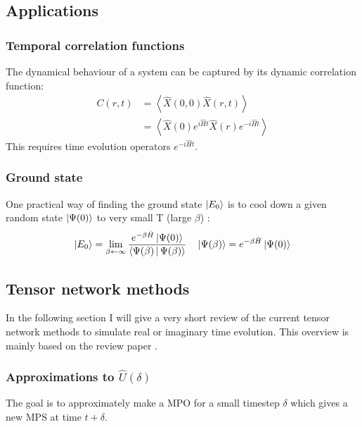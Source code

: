 \subsection{Applications}

\subsubsection{Temporal correlation functions}
The dynamical behaviour of a system can be captured by its dynamic correlation function:
\begin{equation}
    \begin{split}
        C(r,t) &= \left<  \hat{X}(0,0) \hat{X}(r,t)  \right >\\
        &=  \left<  \hat{X}(0)  e^{i \hat{H} t}  \hat{X}(r)  e^{-i \hat{H} t}   \right >
    \end{split}
\end{equation}
This requires time evolution operators $e^{-i \hat{H} t}$.

\subsubsection{Ground state}
One practical way of finding the ground state $ \ket{E_0}$ is to cool down a given random state $ \ket{\Psi(0)}$ to very small T (large $\beta$) \cite{Orus2014}:
\begin{equation}
    \ket{E_0} = \lim_{\beta \leftarrow \infty} \frac{e^{-\beta \hat{H} } \ket{\Psi(0)}  }{  \Braket{ \Psi(\beta) | \Psi(\beta) }  } \quad  \ket{\Psi(\beta)} =  e^{-\beta \hat{H} } \ket{\Psi(0)}
\end{equation}

\subsection{Tensor network methods}
In the following section I will give a very short review of the current tensor network methods to simulate real or imaginary time evolution. This overview is mainly based on the review paper \cite{Paeckel2019}.


\subsubsection{Approximations to  \texorpdfstring{$ \hat{U}(\delta)$}{U}   }
The goal is to approximately make a MPO for a small timestep $\delta$ which gives a new MPS at time $t+\delta$.
